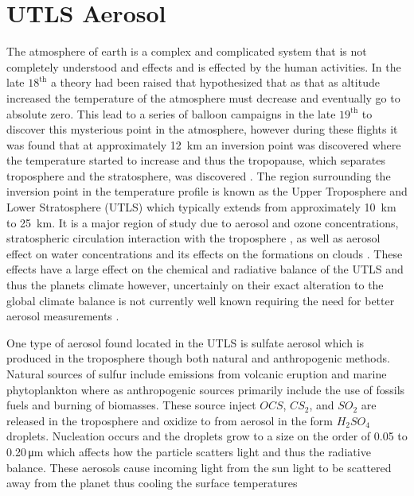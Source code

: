 \section{UTLS Aerosol}

The atmosphere of earth is a complex and complicated system that is not completely understood and effects and is effected by the human activities. In the late $18^{\text{th}}$ a theory had been raised that hypothesized that as that as altitude increased the temperature of the atmosphere must decrease and eventually go to absolute zero. This lead to a series of balloon campaigns in the late $19^{\text{th}}$ to discover this mysterious point in the atmosphere, however during these flights it was found that at approximately 12~km an inversion point was discovered where the temperature started to increase and thus the tropopause, which separates troposphere and the stratosphere, was discovered \citep{Hoinka1997}. The region surrounding the inversion point in the temperature profile is known as the Upper Troposphere and Lower Stratosphere (UTLS) which typically extends from approximately 10~km to 25~km. It is a major region of study due to aerosol and ozone concentrations, stratospheric circulation interaction with the troposphere \citep{Baldwin2007}, as well as aerosol effect on water concentrations and its effects on the formations on clouds \citep{Demott1997}. These effects have a large effect on the chemical and radiative balance of the UTLS and thus the planets climate \citep{McCormick1995,Solomon1999} however, uncertainly on their exact alteration to the global climate balance is not currently well known requiring the need for better aerosol measurements \citep{Solomon2007}.

One type of aerosol found located in the UTLS is sulfate aerosol which is produced in the troposphere though both natural and anthropogenic methods. Natural sources of sulfur include emissions from volcanic eruption and marine phytoplankton \citep{Bates1992} where as anthropogenic sources primarily include the use of fossils fuels and burning of biomasses. These source inject $OCS$, $CS_{2}$, and $SO_{2}$ are released in the troposphere and oxidize to from aerosol in the form $H_{2}SO_{4}$ droplets. Nucleation occurs and the droplets grow to a size on the order of 0.05 to 0.20\,\si{\micro\metre} \citep{Brock1995} which affects how the particle scatters light and thus the radiative balance. These aerosols cause incoming light from the sun light to be scattered away from the planet thus cooling the surface temperatures \citep{Dutton1992,Pollack1976}


